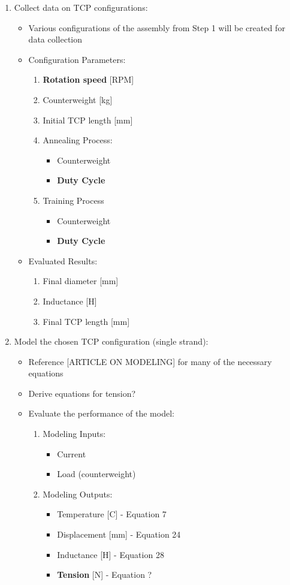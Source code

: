 \begin{enumerate}
		\item Collect data on TCP configurations:
		\begin{itemize}
			\item Various configurations of the assembly from Step 1 will be created for data collection
			\item Configuration Parameters:
			\begin{enumerate}
				\item \textbf{Rotation speed} [RPM]
				\item Counterweight [kg]
				\item Initial TCP length [mm]
				\item Annealing Process:
				\begin{itemize}
					\item Counterweight
					\item \textbf{Duty Cycle}
				\end{itemize}
				\item Training Process
				\begin{itemize}
					\item Counterweight
					\item \textbf{Duty Cycle}
				\end{itemize}
			\end{enumerate}
			\item Evaluated Results:
			\begin{enumerate}
				\item Final diameter [mm]
				\item Inductance [H]
				\item Final TCP length [mm]
			\end{enumerate}
		\end{itemize}
		
		\item Model the chosen TCP configuration (single strand):
		\begin{itemize}
			\item Reference [ARTICLE ON MODELING] for many of the necessary equations
			\item Derive equations for tension?
			\item Evaluate the performance of the model:
			\begin{enumerate}
				\item Modeling Inputs:
				\begin{itemize}
					\item Current
					\item Load (counterweight)
				\end{itemize}
				\item Modeling Outputs:
				\begin{itemize}
					\item Temperature [C] - Equation 7
					\item Displacement [mm] - Equation 24
					\item Inductance [H] - Equation 28
					\item \textbf{Tension} [N] - Equation ?
				\end{itemize}
			\end{enumerate}
		\end{itemize}
	\end{enumerate}